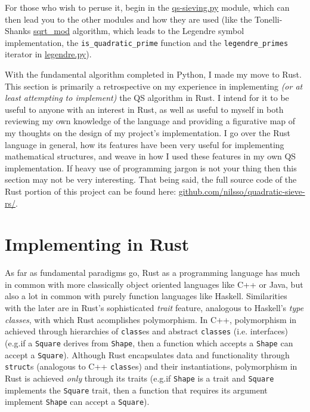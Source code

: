 \documentclass{report}
\begin{document}
For those who wish to peruse it, begin in the
\href{https://github.com/nilsso/quadratic-sieve-rs/blob/main/python-version/qs-sieving.py}{qs-sieving.py}
module, which can then lead you to the other modules and how they are used
(like the Tonelli-Shanks
\href{https://github.com/nilsso/quadratic-sieve-rs/blob/main/python-version/sqrt\_mod.py#L22}{sqrt\_mod}
algorithm, which leads to the Legendre symbol implementation, the \texttt{is_quadratic_prime}
function and the \texttt{legendre_primes} iterator in
\href{https://github.com/nilsso/quadratic-sieve-rs/blob/main/python-version/legendre.py}{legendre.py}).

With the fundamental algorithm completed in Python, I made my move to Rust.
This section is primarily a retrospective on my experience in implementing \emph{(or at
least attempting to implement)} the QS algorithm in Rust. I intend for it to be useful to anyone
with an interest in Rust, as well as useful to myself in both reviewing my own knowledge of the
language and providing a figurative map of my thoughts on the design of my project's implementation.
I go over the Rust language in general, how its features have been very useful for implementing
mathematical structures, and weave in how I used these features in my own QS implementation. If
heavy use of programming jargon is not your thing then this section may not be very interesting.
That being said, the full source code of the Rust portion of this project can be found here:
\href{https://github.com/nilsso/quadratic-sieve-rs/tree/main/src}{github.com/nilsso/quadratic-sieve-rs/}.

\section{Implementing in Rust}

As far as fundamental paradigms go, Rust as a programming language has much in
common with more classically object oriented languages like C++ or Java, but
also a lot in common with purely function languages like Haskell.
Similarities with the later are in Rust's sophisticated \emph{trait} feature,
analogous to Haskell's \emph{type classes}, with which Rust acomplishes
polymorphism.
In C++, polymorphism in achieved through hierarchies of \texttt{class}es and
abstract \texttt{classes} (i.e. interfaces)
(e.g.\@ if a \texttt{Square} derives from \texttt{Shape}, then a function which
accepts a \texttt{Shape} can accept a \texttt{Square}).
Although Rust encapsulates data and functionality through \texttt{struct}s
(analogous to C++ \texttt{class}es) and their instantiations,
polymorphism in Rust is achieved \emph{only} through its traits
(e.g.\@ if \texttt{Shape} is a trait and \texttt{Square} implements the \texttt{Square}
trait, then a function that requires its argument implement \texttt{Shape} can
accept a \texttt{Square}).
\end{document}
